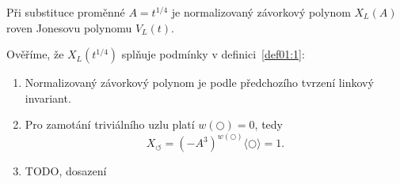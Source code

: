 \begin{tvrz}\label{t01:6}
Při substituce proměnné $A = t^{1/4}$ je normalizovaný závorkový polynom $X_L(A)$  roven Jonesovu polynomu $V_L(t)$.
\end{tvrz}
\begin{dukaz}
Ověříme, že $X_L(t^{1/4})$ splňuje podmínky v definici~\ref{def01:1}:

\begin{enumerate}
\item
Normalizovaný závorkový polynom je podle předchozího tvrzení linkový invariant.
\item
Pro zamotání triviálního uzlu platí $w( \bigcirc) = 0$, tedy $$X_\circlearrowleft = (-A^3)^{w( \bigcirc)} \langle \bigcirc  \rangle = 1.$$ 
\item
TODO, dosazení
\end{enumerate}
$ $
\end{dukaz}

